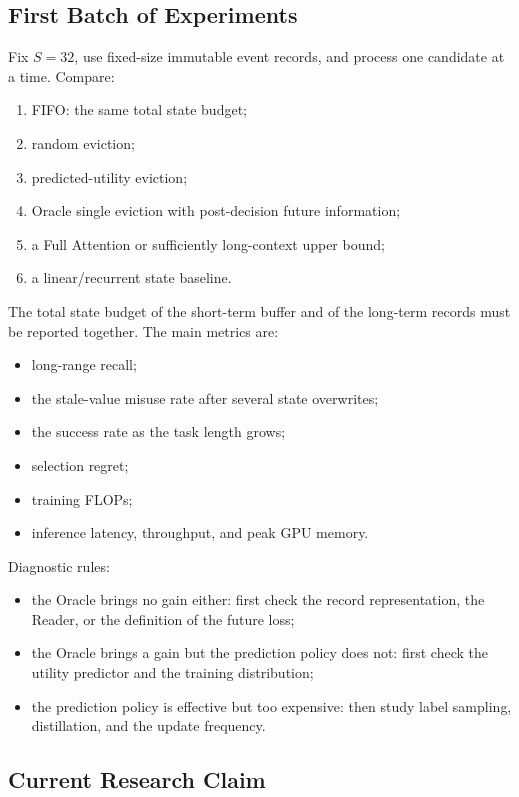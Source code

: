 \subsection{First Batch of Experiments}

Fix $S=32$, use fixed-size immutable event records, and process one candidate at a time. Compare:

\begin{enumerate}
  \item FIFO: the same total state budget;
  \item random eviction;
  \item predicted-utility eviction;
  \item Oracle single eviction with post-decision future information;
  \item a Full Attention or sufficiently long-context upper bound;
  \item a linear/recurrent state baseline.
\end{enumerate}

The total state budget of the short-term buffer and of the long-term records must be reported together. The main metrics are:

\begin{itemize}
  \item long-range recall;
  \item the stale-value misuse rate after several state overwrites;
  \item the success rate as the task length grows;
  \item selection regret;
  \item training FLOPs;
  \item inference latency, throughput, and peak GPU memory.
\end{itemize}

Diagnostic rules:

\begin{itemize}
  \item the Oracle brings no gain either: first check the record representation, the Reader, or the definition of the future loss;
  \item the Oracle brings a gain but the prediction policy does not: first check the utility predictor and the training distribution;
  \item the prediction policy is effective but too expensive: then study label sampling, distillation, and the update frequency.
\end{itemize}

\subsection{Current Research Claim}


